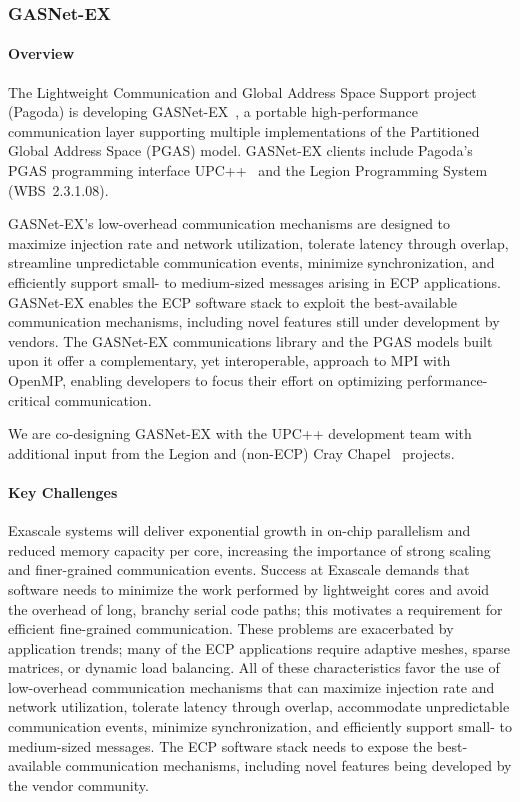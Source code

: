 \subsubsection{ GASNet-EX}\label{subsubsect:gasnet-ex}
\paragraph{Overview} 

The Lightweight Communication and Global Address Space Support project (Pagoda)
is developing GASNet-EX~\cite{gasnet-site}, a portable high-performance communication layer
supporting multiple implementations of the Partitioned Global Address Space
(PGAS) model.
GASNet-EX clients include Pagoda's PGAS programming interface UPC++~\cite{Bachan:paw17,upcxx-site}
 and the Legion Programming
System~\cite{bauer2012legion,legion-site} (WBS~2.3.1.08).

GASNet-EX's low-overhead communication mechanisms are designed to maximize
injection rate and network utilization, tolerate latency through
overlap, streamline unpredictable communication events, minimize
synchronization, and efficiently support small- to medium-sized
messages arising in ECP applications.  GASNet-EX enables the ECP
software stack to exploit the best-available communication mechanisms,
including novel features still under development by vendors.  The
GASNet-EX communications library and the PGAS models built upon it
offer a complementary, yet interoperable, approach to MPI with OpenMP,
enabling developers to focus their effort on optimizing
performance-critical communication.

We are co-designing GASNet-EX with the UPC++ development team with
additional input from the Legion and
(non-ECP) Cray Chapel~\cite{chapel-chapter,chapel-site} projects.

\paragraph{Key  Challenges}

Exascale systems will deliver exponential growth in on-chip parallelism and
reduced memory capacity per core, 
increasing the importance of strong
scaling and finer-grained communication events.  
Success at Exascale demands that
software needs to minimize the work performed by lightweight cores and avoid the
overhead of long, branchy serial code paths; 
this motivates a requirement for efficient
fine-grained communication.
These problems are exacerbated by application trends; many of the ECP applications require
adaptive meshes, sparse matrices,
or dynamic load balancing.
All of these characteristics favor the use of
low-overhead communication mechanisms that
can maximize injection rate and network utilization, tolerate latency through
overlap, accommodate unpredictable communication events, minimize synchronization,
and efficiently support small- to medium-sized messages. The ECP software stack
needs to expose the best-available communication mechanisms, including novel
features being developed by the vendor community.

